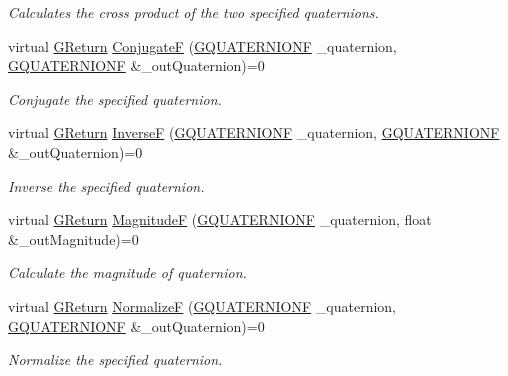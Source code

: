 \begin{DoxyCompactItemize}
\begin{DoxyCompactList}\small\item\em Calculates the cross product of the two specified quaternions. \end{DoxyCompactList}\item 
virtual \mbox{\hyperlink{namespaceGW_a67a839e3df7ea8a5c5686613a7a3de21}{G\+Return}} \mbox{\hyperlink{classGW_1_1MATH_1_1GQuaternion_adc0da83f5c6011f45195ae98a3f1fa8d}{ConjugateF}} (\mbox{\hyperlink{structGW_1_1MATH_1_1GQUATERNIONF}{G\+Q\+U\+A\+T\+E\+R\+N\+I\+O\+NF}} \+\_\+quaternion, \mbox{\hyperlink{structGW_1_1MATH_1_1GQUATERNIONF}{G\+Q\+U\+A\+T\+E\+R\+N\+I\+O\+NF}} \&\+\_\+out\+Quaternion)=0
\begin{DoxyCompactList}\small\item\em Conjugate the specified quaternion. \end{DoxyCompactList}\item 
virtual \mbox{\hyperlink{namespaceGW_a67a839e3df7ea8a5c5686613a7a3de21}{G\+Return}} \mbox{\hyperlink{classGW_1_1MATH_1_1GQuaternion_a0d8a509536ddf1a4840f48f719686b22}{InverseF}} (\mbox{\hyperlink{structGW_1_1MATH_1_1GQUATERNIONF}{G\+Q\+U\+A\+T\+E\+R\+N\+I\+O\+NF}} \+\_\+quaternion, \mbox{\hyperlink{structGW_1_1MATH_1_1GQUATERNIONF}{G\+Q\+U\+A\+T\+E\+R\+N\+I\+O\+NF}} \&\+\_\+out\+Quaternion)=0
\begin{DoxyCompactList}\small\item\em Inverse the specified quaternion. \end{DoxyCompactList}\item 
virtual \mbox{\hyperlink{namespaceGW_a67a839e3df7ea8a5c5686613a7a3de21}{G\+Return}} \mbox{\hyperlink{classGW_1_1MATH_1_1GQuaternion_a47c8b900ab4ab210631f1dfb280c89fd}{MagnitudeF}} (\mbox{\hyperlink{structGW_1_1MATH_1_1GQUATERNIONF}{G\+Q\+U\+A\+T\+E\+R\+N\+I\+O\+NF}} \+\_\+quaternion, float \&\+\_\+out\+Magnitude)=0
\begin{DoxyCompactList}\small\item\em Calculate the magnitude of quaternion. \end{DoxyCompactList}\item 
virtual \mbox{\hyperlink{namespaceGW_a67a839e3df7ea8a5c5686613a7a3de21}{G\+Return}} \mbox{\hyperlink{classGW_1_1MATH_1_1GQuaternion_ac1f96d734beba721fdfbc2e5cfb72cd2}{NormalizeF}} (\mbox{\hyperlink{structGW_1_1MATH_1_1GQUATERNIONF}{G\+Q\+U\+A\+T\+E\+R\+N\+I\+O\+NF}} \+\_\+quaternion, \mbox{\hyperlink{structGW_1_1MATH_1_1GQUATERNIONF}{G\+Q\+U\+A\+T\+E\+R\+N\+I\+O\+NF}} \&\+\_\+out\+Quaternion)=0
\begin{DoxyCompactList}\small\item\em Normalize the specified quaternion. \end{DoxyCompactList}\item 

\end{DoxyCompactItemize}
